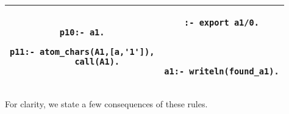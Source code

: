 \begin{itemize}
\begin{center}
\begin{tabular}{cc}
\begin{minipage}{18.5em}
\begin{verbatim}
p10:- a1.

p11:- atom_chars(A1,[a,'1']),
      call(A1).

\end{verbatim}
\end{minipage}
&
\begin{minipage}{14.5em}
\begin{verbatim}
:- export a1/0.




a1:- writeln(found_a1).

\end{verbatim}
\end{minipage}
\\ \hline \hline
\end{tabular}
\end{center}
%
\end{itemize}
%
For clarity, we state a few consequences of these rules.

